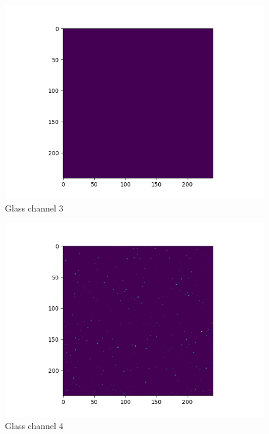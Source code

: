 \documentclass[12pt,reqno]{amsart}
\numberwithin{equation}{section}
\begin{document}
\begin{enumerate}
\begin{figure}[H]
\centering
\includegraphics[scale=0.6]{glass_channel_3}
\caption{Glass channel 3}
\end{figure}

\begin{figure}[H]
\centering
\includegraphics[scale=0.6]{glass_channel_4}
\caption{Glass channel 4}
\end{figure}


\end{enumerate}
\end{document}
